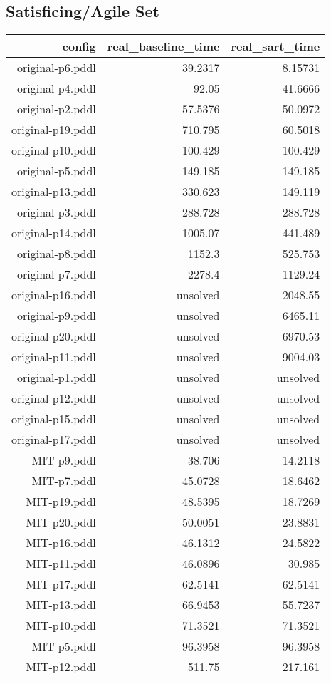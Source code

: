 \documentclass{article}
\begin{document}
                    
                    \subsection*{Satisficing/Agile Set}
                    
                            \begin{center}
                            \scriptsize
                            \begin{tabular}{r|r|r}
                            config & real\_baseline\_time & real\_sart\_time\\\midrule
                             original-p6.pddl&39.2317&8.15731\\
 original-p4.pddl&92.05&41.6666\\
 original-p2.pddl&57.5376&50.0972\\
 original-p19.pddl&710.795&60.5018\\
 original-p10.pddl&100.429&100.429\\
 original-p5.pddl&149.185&149.185\\
 original-p13.pddl&330.623&149.119\\
 original-p3.pddl&288.728&288.728\\
 original-p14.pddl&1005.07&441.489\\
 original-p8.pddl&1152.3&525.753\\
 original-p7.pddl&2278.4&1129.24\\
 original-p16.pddl&unsolved&2048.55\\
 original-p9.pddl&unsolved&6465.11\\
 original-p20.pddl&unsolved&6970.53\\
 original-p11.pddl&unsolved&9004.03\\
 original-p1.pddl&unsolved&unsolved\\
 original-p12.pddl&unsolved&unsolved\\
 original-p15.pddl&unsolved&unsolved\\
 original-p17.pddl&unsolved&unsolved\\
 MIT-p9.pddl&38.706&14.2118\\
 MIT-p7.pddl&45.0728&18.6462\\
 MIT-p19.pddl&48.5395&18.7269\\
 MIT-p20.pddl&50.0051&23.8831\\
 MIT-p16.pddl&46.1312&24.5822\\
 MIT-p11.pddl&46.0896&30.985\\
 MIT-p17.pddl&62.5141&62.5141\\
 MIT-p13.pddl&66.9453&55.7237\\
 MIT-p10.pddl&71.3521&71.3521\\
 MIT-p5.pddl&96.3958&96.3958\\
 MIT-p12.pddl&511.75&217.161
                            \end{tabular}
                            \end{center}
                    
\end{document}
